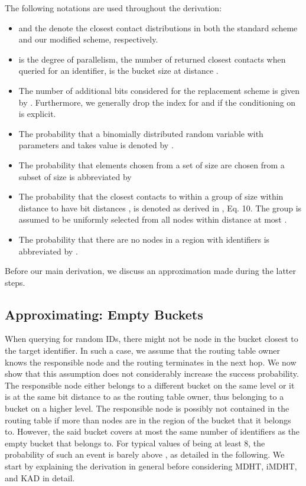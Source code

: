 \documentclass[10pt, conference, compsocconf, letterpaper]{IEEEtran}
\begin{document}
\vspace{3pt}
The following notations are used throughout the derivation: 
\begin{itemize}
\item  and the  denote the closest contact distributions in both the standard scheme and our modified scheme, respectively.
\item  is the degree of parallelism,  the number of returned closest contacts when queried
for an identifier,  is the bucket size at distance .
\item The number of additional bits considered for the replacement scheme is given by 
. Furthermore, we generally drop the index  for  and  if the conditioning on  is explicit.
\item The probability that a binomially distributed random variable with parameters  and
 takes value  is denoted by .
\item The probability that  elements chosen from a set  of size  are chosen from a subset
 of size  is abbreviated by 

\item The probability that the  closest
contacts to  within a group of size  within distance  to  
have bit distances , is denoted  as derived in \cite{roos13comprehending},
Eq. 10. The group is assumed
to be uniformly selected from all nodes within distance at most . 
\item  The probability that there are no nodes in a region with  identifiers
is abbreviated by .
\end{itemize}
Before our main derivation, we discuss an approximation made during the latter steps.

\subsection{Approximating: Empty Buckets}
\label{sec:approximation}
When querying for random IDs, there might not
be node in the bucket closest to the target identifier.
In such a case, we assume that the routing table owner knows the responsible node and the
routing terminates in the next hop.
We now show that this assumption does not considerably increase the success probability.
The responsible node either belongs to a different bucket on the same level or it is at the same
bit distance to  as the routing table owner, thus belonging to a bucket on a higher level.
The responsible node is possibly not contained in the routing table if more than  nodes
are in the region of the bucket that it belongs to.
However, the said bucket covers at most the same number of identifiers as the empty bucket that  belongs to. For typical values of  being at least 8, the probability 
of such an event is barely above , as detailed in the following.
We start by explaining the derivation in general before considering
MDHT, iMDHT, and KAD in detail.
\end{document}
